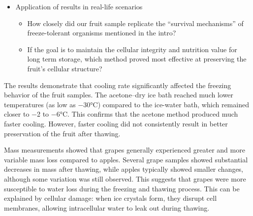 \begin{itemize}
  \begin{itemize}
  \item
    Were there any changes in mass of the thawed fruit samples using
    ice-water bath before/after the cooling process? Were there any
    changes in mass of the thawed fruit samples using acetone-dry ice
    bath method before/after the cooling process?
  \item
    How do the mass differences between the two processes compare?
  \item
    Could these differences be explained using what is currently known
    about the process in literature?
  \item
    How does the formation of ice crystals affect the macro and
    microscopic textures of the fruits?
  \item
    How does the impact on the texture after our supercooling process
    differ from flash freezing methods of preservation?
  \item
    What might the mass change indicate about the freezing process and
    its effect on the fruit (think about membranes, their structure,
    tissues, etc.)
  \end{itemize}
\item
  Application of results in real-life scenarios

  \begin{itemize}
  \item
    How closely did our fruit sample replicate the ``survival
    mechanisms'' of freeze-tolerant organisms mentioned in the intro?
  \item
    If the goal is to maintain the cellular integrity and nutrition
    value for long term storage, which method proved most effective at
    preserving the fruit's cellular structure?
  \end{itemize}
\end{itemize}

The results demonstrate that cooling rate significantly affected the
freezing behavior of the fruit samples. The acetone--dry ice bath
reached much lower temperatures (as low as −30°C) compared to the
ice-water bath, which remained closer to −2 to −6°C. This confirms that
the acetone method produced much faster cooling. However, faster cooling
did not consistently result in better preservation of the fruit after
thawing.

Mass measurements showed that grapes generally experienced greater and
more variable mass loss compared to apples. Several grape samples showed
substantial decreases in mass after thawing, while apples typically
showed smaller changes, although some variation was still observed. This
suggests that grapes were more susceptible to water loss during the
freezing and thawing process. This can be explained by cellular damage:
when ice crystals form, they disrupt cell membranes, allowing
intracellular water to leak out during thawing.

